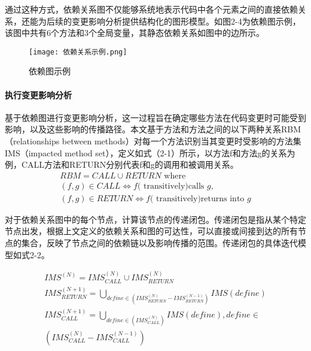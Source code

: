 通过这种方式，依赖关系图不仅能够系统地表示代码中各个元素之间的直接依赖关系，还能为后续的变更影响分析提供结构化的图形模型。如图2-4为依赖图示例，该图中共有6个方法和3个全局变量，其静态依赖关系如图中的边所示。

\begin{figure}[h]
    \centering
    \texttt{[image: 依赖关系示例.png]}
    \caption{依赖图示例}
    \end{figure}

\paragraph{执行变更影响分析}

基于依赖图进行变更影响分析，这一过程旨在确定哪些方法在代码变更时可能受到影响，以及这些影响的传播路径。本文基于方法和方法之间的以下两种关系RBM（relationships between methods）对每一个方法识别当其变更时受影响的方法集IMS（impacted method set），定义如式（2-1）所示，以方法f和方法g的关系为例，CALL方法和RETURN分别代表f和g的调用和被调用关系。
\begin{equation}
\begin{array}{l}
R B M=C A L L \cup R E T U R N \text { where } \\
(f, g) \in C A L L \Longleftrightarrow f(\text { transitively)calls } g, \\
(f, g) \in R E T U R N \Longleftrightarrow f(\text { transitively)returns into } g
\end{array}
\end{equation}

对于依赖关系图中的每个节点，计算该节点的传递闭包。传递闭包是指从某个特定节点出发，根据上文定义的依赖关系和图的可达性，可以直接或间接到达的所有节点的集合，反映了节点之间的依赖链以及影响传播的范围。传递闭包的具体迭代模型如式2-2。

\begin{equation}
\begin{array}{l}
I M S^{(N)}=I M S_{C A L L}^{(N)} \cup I M S_{R E T U R N}^{(N)} \\
I M S_{ {RETURN }}^{(N+1)}=\bigcup_{define \in (I M S_{R E T U R N}^{(N)}-I M S_{R E T U R N}^{(N-1)} ) } I M S({ define }) \\
I M S_{C A L L}^{(N+1)}=\bigcup_{ {define } \in (I M S_{C A L L}^{(N)})} I M S( { define }){, define } \in \\
\left(I M S_{C A L L}^{(N)}-I M S_{C A L L}^{(N-1)}\right) 
\end{array}
\end{equation}


